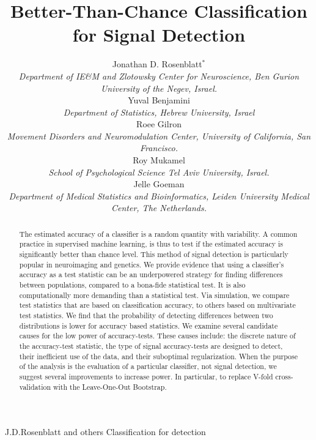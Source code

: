 \documentclass[]{bio}
\begin{document}
\title{Better-Than-Chance Classification for Signal Detection}

\author{Jonathan D. Rosenblatt$^\ast$ \\ 
	\textit{Department of IE\&M and Zlotowsky Center for Neuroscience, 
		Ben Gurion University of the Negev, Israel.} 
	\\ Yuval Benjamini \\
	\textit{Department of Statistics, Hebrew University, Israel}	
	\\ Roee Gilron \\ 
	\textit{Movement Disorders and Neuromodulation Center, University of California, San Francisco.}
	\\ Roy Mukamel \\ 
	\textit{School of Psychological Science Tel Aviv University, Israel.}
	\\ Jelle Goeman \\ 
	\textit{Department of Medical Statistics and Bioinformatics, Leiden University Medical Center, The Netherlands.}
}


\markboth%
{J.D.Rosenblatt and others}
{Classification for detection}

\maketitle


\begin{abstract}
{
	The estimated accuracy of a classifier is a random quantity with variability. 
	A common practice in supervised machine learning, is thus to test if the estimated accuracy is significantly better than chance level.
	This method of signal detection is particularly popular in neuroimaging and genetics.
	We provide evidence that using a classifier's accuracy as a test statistic can be an underpowered strategy for finding differences between populations, compared to a bona-fide statistical test.
	It is also computationally more demanding than a statistical test. 
	Via simulation, we compare test statistics that are based on classification accuracy, to others based on multivariate test statistics. 
	We find that the probability of detecting differences between two distributions is lower for accuracy based statistics.
	We examine several candidate causes for the low power of accuracy-tests. 
	These causes include: the discrete nature of the accuracy-test statistic, the type of signal accuracy-tests are designed to detect, their inefficient use of the data, and their suboptimal regularization. 
	When the purpose of the analysis is the evaluation of a particular classifier, not signal detection, we suggest several improvements to increase power. 
	In particular, to replace V-fold cross-validation with the Leave-One-Out Bootstrap.
	}
\end{abstract}
\end{document}
